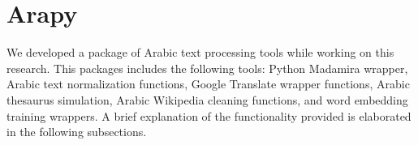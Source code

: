 \section{Arapy}

We developed a package of Arabic text processing tools while working on this research. This packages includes the following tools: Python Madamira wrapper, Arabic text normalization functions, Google Translate wrapper functions, Arabic thesaurus simulation, Arabic Wikipedia cleaning functions, and word embedding training wrappers. A brief explanation of the functionality provided is elaborated in the following subsections.







\label{sec:arapy}
